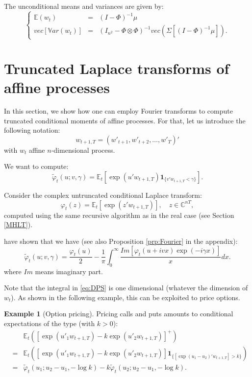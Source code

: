 \documentclass[
  12pt,
]{book}
\theoremstyle{definition}
\theoremstyle{definition}
\newtheorem{example}{Example}[chapter]
\theoremstyle{definition}
\theoremstyle{definition}
\theoremstyle{remark}
\begin{document}
The unconditional means and variances are given by:
\begin{equation}
\left\{
\begin{array}{ccl}
\mathbb{E}(w_t) &=& (I - \Phi)^{-1}\mu\\
vec[\mathbb{V}ar(w_t)] &=& (I_{n^2} - \Phi \otimes \Phi)^{-1} vec\left(\Sigma[(I - \Phi)^{-1}\mu]\right).
\end{array}
\right.\label{eq:uncondmeanvar}
\end{equation}

\hypertarget{TransfAna}{%
\section{Truncated Laplace transforms of affine processes}\label{TransfAna}}

In this section, we show how one can employ Fourier transforms to compute truncated conditional moments of affine processes. For that, let us introduce the following notation:
\[
w_{t+1,T} = (w'_{t+1}, w'_{t+2},\dots, w'_T)'
\]
with \(w_t\) affine \(n\)-dimensional process.

We want to compute:
\[
\tilde{\varphi}_t(u ; v, \gamma) = \mathbb{E}_t[\exp(u'w_{t+1,T})\textbf{1}_{\{v'w_{t+1,T}<\gamma\}}].
\]

Consider the complex untruncated conditional Laplace transform:
\[
\varphi_t(z) = \mathbb{E}_t[\exp(z'w_{t+1,T})],\quad  z \in \mathbb{C}^{nT},
\]
computed using the same recursive algorithm as in the real case (see Section \ref{MHLT}).

\citet{Duffie_Pan_Singleton_2000} have shown that we have (see also Proposition \ref{prp:Fourier} in the appendix):
\begin{equation}
\tilde{\varphi}_t(u ; v, \gamma) =  \frac{\varphi_t(u)}{2} - \frac{1}{\pi}
\int^\infty_0 \frac{Im[\varphi_t(u+ivx) \exp(-i\gamma x)]}{x} dx.\label{eq:DPS}
\end{equation}
where \(Im\) means imaginary part.

Note that the integral in \eqref{eq:DPS} is one dimensional (whatever the dimension of \(w_t\)). As shown in the following example, this can be exploited to price options.

\begin{example}[Option pricing]
\protect\hypertarget{exm:OptionPricing}{}\label{exm:OptionPricing}Pricing calls and puts amounts to conditional expectations of the type (with \(k > 0\)):
\begin{eqnarray*}
&& \mathbb{E}_t\left([\exp(u'_1 w_{t+1,T})-k   \exp(u'_2 w_{t+1,T})]^+\right) \\
&= &  \mathbb{E}_t\left([\exp(u'_1 w_{t+1,T})-k   \exp(u'_2 w_{t+1,T})]\textbf{1}_{\{[\exp(u_1-u_2)'w_{t+1,T}] > k \}}\right) \\
&= & \tilde{\varphi}_t(u_1 ; u_2-u_1, - \log   k) - k \tilde{\varphi}_t(u_2 ; u_2-u_1, - \log   k).
\end{eqnarray*}
\end{example}
\end{document}
